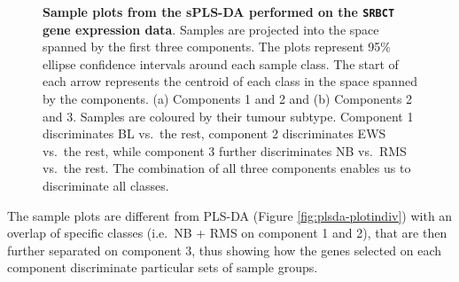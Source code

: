 \documentclass[]{book}
\begin{document}
\begin{figure}

{\centering {}

}

\caption{\textbf{Sample plots from the sPLS-DA performed on the \texttt{SRBCT} gene expression data}. Samples are projected into the space spanned by the first three components. The plots represent 95\% ellipse confidence intervals around each sample class. The start of each arrow represents the centroid of each class in the space spanned by the components. (a) Components 1 and 2 and (b) Components 2 and 3. Samples are coloured by their tumour subtype. Component 1 discriminates BL vs.~the rest, component 2 discriminates EWS vs.~the rest, while component 3 further discriminates NB vs.~RMS vs.~the rest. The combination of all three components enables us to discriminate all classes.}\label{fig:splsda-indiv}
\end{figure}



The sample plots are different from PLS-DA (Figure \ref{fig:plsda-plotindiv}) with an overlap of specific classes (i.e.~NB + RMS on component 1 and 2), that are then further separated on component 3, thus showing how the genes selected on each component discriminate particular sets of sample groups.
\end{document}
